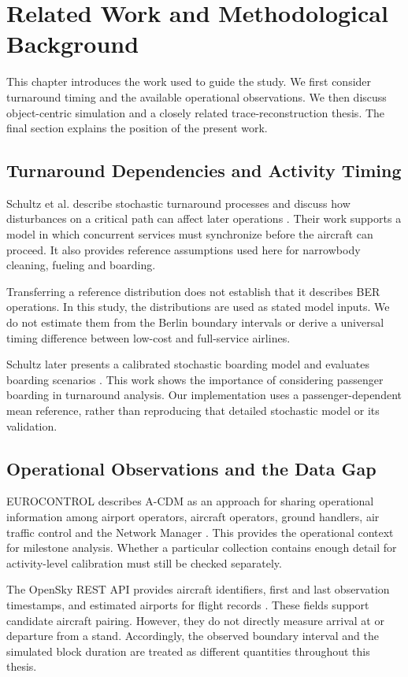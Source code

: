 \chapter{Related Work and Methodological Background}
\label{ch:related}

This chapter introduces the work used to guide the study. We first consider turnaround timing and the available operational observations. We then discuss object-centric simulation and a closely related trace-reconstruction thesis. The final section explains the position of the present work.

\section{Turnaround Dependencies and Activity Timing}
Schultz et al. describe stochastic turnaround processes and discuss how disturbances on a critical path can affect later operations \cite{schultz2012dynamic}. Their work supports a model in which concurrent services must synchronize before the aircraft can proceed. It also provides reference assumptions used here for narrowbody cleaning, fueling and boarding.

Transferring a reference distribution does not establish that it describes BER operations. In this study, the distributions are used as stated model inputs. We do not estimate them from the Berlin boundary intervals or derive a universal timing difference between low-cost and full-service airlines.

Schultz later presents a calibrated stochastic boarding model and evaluates boarding scenarios \cite{schultz2018boarding}. This work shows the importance of considering passenger boarding in turnaround analysis. Our implementation uses a passenger-dependent mean reference, rather than reproducing that detailed stochastic model or its validation.

\section{Operational Observations and the Data Gap}
EUROCONTROL describes A-CDM as an approach for sharing operational information among airport operators, aircraft operators, ground handlers, air traffic control and the Network Manager \cite{eurocontrol_acdm}. This provides the operational context for milestone analysis. Whether a particular collection contains enough detail for activity-level calibration must still be checked separately.

The OpenSky REST API provides aircraft identifiers, first and last observation timestamps, and estimated airports for flight records \cite{opensky_rest}. These fields support candidate aircraft pairing. However, they do not directly measure arrival at or departure from a stand. Accordingly, the observed boundary interval and the simulated block duration are treated as different quantities throughout this thesis.

